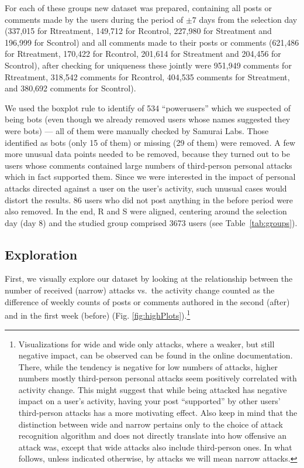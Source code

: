 \documentclass[
  10pt,
  dvipsnames]{scrartcl}
\begin{document}
For each of these groups new dataset was prepared, containing all posts
or comments made by the users during the period of \(\pm 7\) days from
the selection day (337,015 for \textsf{Rtreatment}, 149,712 for
\textsf{Rcontrol}, 227,980 for \textsf{Streatment} and 196,999 for
\textsf{Scontrol}) and all comments made to their posts or comments
(621,486 for \textsf{Rtreatment}, 170,422 for \textsf{Rcontrol}, 201,614
for \textsf{Streatment} and 204,456 for \textsf{Scontrol}), after
checking for uniqueness these jointly were 951,949 comments for
\textsf{Rtreatment}, 318,542 comments for \textsf{Rcontrol}, 404,535
comments for \textsf{Streatment}, and 380,692 comments for
\textsf{Scontrol}).

\vspace{1mm}

We used the boxplot rule to identify of 534 ``powerusers'' which we
suspected of being bots (even though we already removed users whose
names suggested they were bots) --- all of them were manually checked by
\textsf{Samurai Labs}. Those identified as bots (only 15 of them) or
missing (29 of them) were removed. A few more unusual data points needed
to be removed, because they turned out to be users whose comments
contained large numbers of third-person personal attacks which in fact
supported them. Since we were interested in the impact of personal
attacks directed against a user on the user's activity, such unusual
cases would distort the results. 86 users who did not post anything in
the \textsf{before} period were also removed. In the end, \textsf{R} and
\textsf{S} were aligned, centering around the selection day (day 8) and
the studied group comprised 3673 users (see
\mbox{Table \ref{tab:groups}}).

\subsection{Exploration}

First, we visually explore our dataset by looking at the relationship
between the number of received (narrow) attacks vs.~the activity change
counted as the difference of weekly counts of posts or comments authored
in the second (\textsf{after}) and in the first week (\textsf{before})
(Fig. \ref{fig:highPlots}).\footnote{Visualizations for \textsf{wide}
  and \textsf{wide only} attacks, where a weaker, but still negative
  impact, can be observed can be found in the online documentation.
  There, while the tendency is negative for low numbers of attacks,
  higher numbers mostly third-person personal attacks seem positively
  correlated with activity change. This might suggest that while being
  attacked has negative impact on a user's activity, having your post
  ``supported'' by other users' third-person attacks has a more
  motivating effect. Also keep in mind that the distinction between wide
  and narrow pertains only to the choice of attack recognition algorithm
  and does not directly translate into how offensive an attack was,
  except that \textsf{wide} attacks also include third-person ones. In
  what follows, unless indicated otherwise, by attacks we will mean
  narrow attacks.}
\end{document}
